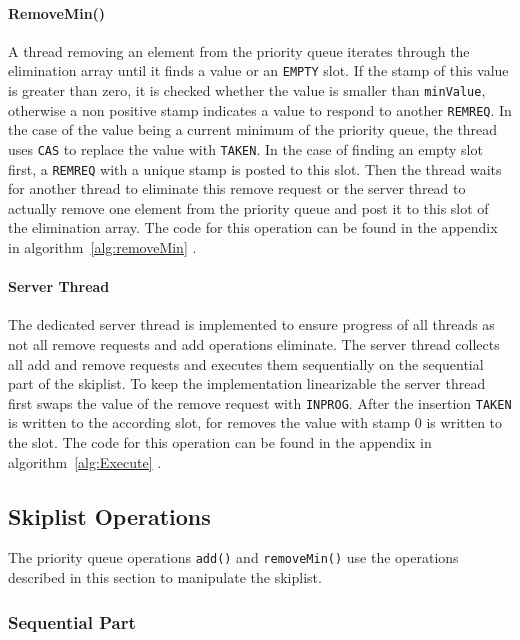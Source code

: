 \paragraph{RemoveMin()} A thread removing an element from the priority queue iterates through the elimination array until it finds a value or an \texttt{EMPTY} slot. If the stamp of this value is greater than zero, it is checked whether the value is smaller than \texttt{minValue}, otherwise a non positive stamp indicates a value to respond to another \texttt{REMREQ}. In the case of the value being a current minimum of the priority queue, the thread uses \texttt{CAS} to replace the value with \texttt{TAKEN}. In the case of finding an empty slot first, a \texttt{REMREQ} with a unique stamp is posted to this slot. Then the thread waits for another thread to eliminate this remove request or the server thread to actually remove one element from the priority queue and post it to this slot of the elimination array. The code for this operation can be found in the appendix in algorithm~\ref{alg:removeMin} \cite{calciu_adaptive_2014}.

\paragraph{Server Thread} The dedicated server thread is implemented to ensure progress of all threads as not all remove requests and add operations eliminate. The server thread collects all add and remove requests and executes them sequentially on the sequential part of the skiplist. To keep the implementation linearizable the server thread first swaps the value of the remove request with \texttt{INPROG}. After the insertion \texttt{TAKEN} is written to the according slot, for removes the value with stamp 0 is written to the slot. The code for this operation can be found in the appendix in algorithm~\ref{alg:Execute} \cite{calciu_adaptive_2014}.

\subsection{Skiplist Operations}

The priority queue operations \texttt{add()} and \texttt{removeMin()} use the operations described in this section to manipulate the skiplist.

\subsubsection{Sequential Part}

